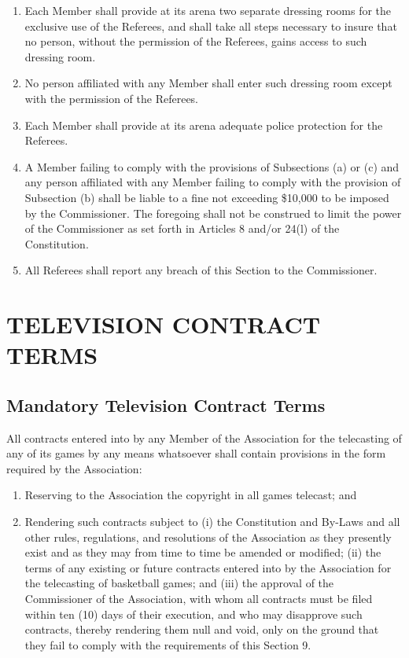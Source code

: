 \documentclass[]{book}
\providecommand{\tightlist}{%
  \setlength{\itemsep}{0pt}\setlength{\parskip}{0pt}}
\theoremstyle{definition}
\theoremstyle{definition}
\theoremstyle{definition}
\theoremstyle{remark}
\begin{document}
\begin{enumerate}
\def\labelenumi{(\alph{enumi})}
\tightlist
\item
  Each Member shall provide at its arena two separate dressing rooms for
  the exclusive use of the Referees, and shall take all steps necessary
  to insure that no person, without the permission of the Referees,
  gains access to such dressing room.
\item
  No person affiliated with any Member shall enter such dressing room
  except with the permission of the Referees.
\item
  Each Member shall provide at its arena adequate police protection for
  the Referees.
\item
  A Member failing to comply with the provisions of Subsections (a) or
  (c) and any person affiliated with any Member failing to comply with
  the provision of Subsection (b) shall be liable to a fine not
  exceeding \$10,000 to be imposed by the Commissioner. The foregoing
  shall not be construed to limit the power of the Commissioner as set
  forth in Articles 8 and/or 24(l) of the Constitution.
\item
  All Referees shall report any breach of this Section to the
  Commissioner.
\end{enumerate}

\section{TELEVISION CONTRACT TERMS}\label{television-contract-terms}

\subsection{Mandatory Television Contract
Terms}\label{mandatory-television-contract-terms}

All contracts entered into by any Member of the Association for the
telecasting of any of its games by any means whatsoever shall contain
provisions in the form required by the Association:

\begin{enumerate}
\def\labelenumi{(\alph{enumi})}
\tightlist
\item
  Reserving to the Association the copyright in all games telecast; and
\item
  Rendering such contracts subject to (i) the Constitution and By-Laws
  and all other rules, regulations, and resolutions of the Association
  as they presently exist and as they may from time to time be amended
  or modified; (ii) the terms of any existing or future contracts
  entered into by the Association for the telecasting of basketball
  games; and (iii) the approval of the Commissioner of the Association,
  with whom all contracts must be filed within ten (10) days of their
  execution, and who may disapprove such contracts, thereby rendering
  them null and void, only on the ground that they fail to comply with
  the requirements of this Section 9.
\end{enumerate}
\end{document}
